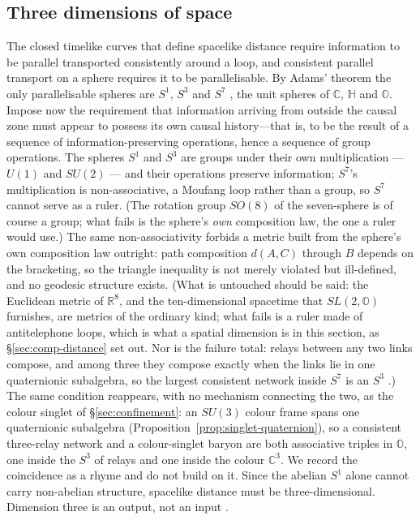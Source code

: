 \subsection{Three dimensions of space}
\label{sec:three-dimensions}

The closed timelike curves that define spacelike distance require information to
be parallel transported consistently around a loop, and consistent parallel
transport on a sphere requires it to be parallelisable. By Adams' theorem the
only parallelisable spheres are $S^{1}$, $S^{3}$ and $S^{7}$
\autocite{adams1960hopf}, the unit spheres of $\mathbb{C}$, $\mathbb{H}$ and
$\mathbb{O}$. Impose now the requirement that information arriving from outside
the causal zone must appear to possess its own causal history---that is, to be the
result of a sequence of information-preserving operations, hence a sequence of
group operations. The spheres $S^{1}$ and $S^{3}$ are groups under their own multiplication --- $U(1)$ and
$SU(2)$ --- and their operations preserve information; $S^{7}$'s multiplication is non-associative,
a Moufang loop rather than a group, so $S^{7}$ cannot serve as a ruler. (The rotation group
$SO(8)$ of the seven-sphere is of course a group; what fails is the sphere's \emph{own}
composition law, the one a ruler would use.) The same non-associativity
forbids a metric built from the sphere's own composition law outright: path
composition $d(A,C)$ through $B$ depends on the bracketing, so the triangle inequality is not merely violated but ill-defined, and
no geodesic structure exists. (What is untouched should be said: the Euclidean metric of
$\mathbb{R}^{8}$, and the ten-dimensional spacetime that $SL(2,\mathbb{O})$ furnishes, are metrics
of the ordinary kind; what fails is a ruler made of antitelephone loops, which is what a spatial
dimension is in this section, as \S\ref{sec:comp-distance} set out. Nor is the failure total:
relays between any two links compose, and among three they compose exactly when the links lie in
one quaternionic subalgebra, so the largest consistent network inside $S^{7}$ is an $S^{3}$
\autocite{conway_2003,harvey1982calibrated}.) The same condition reappears, with no mechanism connecting the two, as
the colour singlet of \S\ref{sec:confinement}: an $SU(3)$ colour frame spans one quaternionic
subalgebra (Proposition~\ref{prop:singlet-quaternion}), so a consistent three-relay network and a
colour-singlet baryon are both associative triples in $\mathbb{O}$, one inside the $S^{3}$ of relays
and one inside the colour $\mathbb{C}^{3}$. We record the coincidence as a rhyme and do not build on
it. Since the abelian $S^{1}$ alone cannot carry
non-abelian structure, spacelike distance must be three-dimensional. Dimension
three is an output, not an input \autocite{small_2006}.

